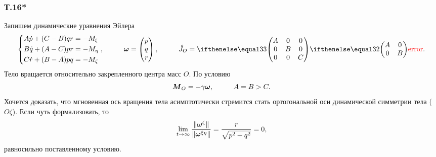 \subsubsection*{Т.16*}


Запишем динамические уравнения Эйлера
\begin{equation}
    \left\{\begin{aligned}
        A \dot{p} + (C-B) q r &= - M_{\xi} \\
        B \dot{q} + (A-C) p r &= - M_{\eta} \\
        C \dot{r} + (B-A) p q &= - M_{\zeta} \\
    \end{aligned}\right.,
    \hspace{1cm} 
    \vc{\omega} = \begin{pmatrix}
        p \\ q \\ r
    \end{pmatrix}, 
    \hspace{1cm} 
    \hat{J}_O = \dmat{3}{A}{B}{C}.
\end{equation}
Тело вращается относительно закрепленного центра масс $O$. По условию
\begin{equation*}
    \mbox{\boldmath $M$}_O = - \gamma \mbox{\boldmath $\omega$},
    \hspace{1cm} 
    A = B > C.
\end{equation*}
Хочется доказать, что мгновенная ось вращения тела асимптотически стремится стать ортогональной оси динамической симметрии тела ($O\zeta$). Если чуть формализовать, то 
\begin{equation}
\label{lim}
    \lim_{t \to \infty} \frac{\|\mbox{\boldmath $\omega$}^{\zeta}\|}{\|\mbox{\boldmath $\omega$}^{\xi\eta}\|} = \frac{r}{\sqrt{p^2+q^2}} = 0,
\end{equation}
равносильно поставленному условию.

